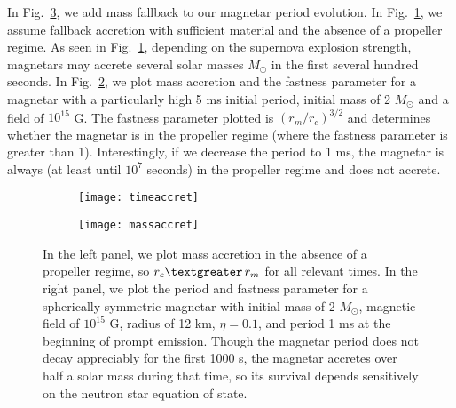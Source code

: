 \documentclass{article}
\begin{document}
In Fig.~\ref{fig:5}, we add mass fallback to our magnetar period evolution. In Fig.~\ref{fig:5a}, we assume fallback accretion with sufficient material and the absence of a propeller regime. As seen in Fig.~\ref{fig:5a}, depending on the supernova explosion strength,  magnetars may accrete several solar masses $M_{\odot}$ in the first several hundred seconds. In Fig.~\ref{fig:5b}, we plot mass accretion and the fastness parameter for a magnetar with a particularly high 5 ms initial period, initial mass of 2 $M_{\odot}$ and a field of $10^{15}$ G. The fastness parameter plotted is $(r_m/r_c)^{3/2}$ and determines whether the magnetar is in the propeller regime (where the fastness parameter is greater than 1). Interestingly, if we decrease the period to 1 ms, the magnetar is always (at least until $10^7$ seconds) in the propeller regime and does not accrete. 
\begin{figure}[h!]
\centering
\begin{subfigure}{.5\textwidth}
    \centering
    \texttt{[image: timeaccret]}
    \caption{}
    \label{fig:5a}
\end{subfigure}%
\begin{subfigure}{.5\textwidth}
    \centering
    \texttt{[image: massaccret]}
    \caption{}
    \label{fig:5b}
\end{subfigure}
\caption{In the left panel, we plot mass accretion in the absence of a propeller regime, so $r_c \textgreater\,r_m$ for all relevant times. In the right panel, we plot the period and fastness parameter for a spherically symmetric  magnetar with initial mass of 2 $M_{\odot}$, magnetic field of $10^{15}$ G, radius of 12 km, $\eta=0.1$,  and period 1 ms at the beginning of prompt emission. Though the magnetar period does not decay appreciably for the first 1000 s, the magnetar accretes over half a solar mass during that time, so its survival depends sensitively on the neutron star equation of state.}
\label{fig:5}
\end{figure}
\end{document}
